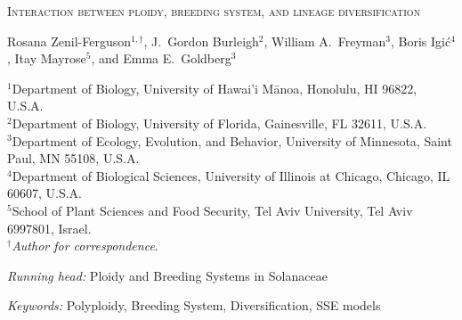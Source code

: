 \documentclass[11pt]{article}
\begin{document}


%
%
%
\begin{center}
    \textsc{Interaction between ploidy, breeding system, and lineage diversification}

\vfill

\noindent 
Rosana Zenil-Ferguson$^{1,\dagger}$,
%
J.~Gordon Burleigh$^{2}$,
%
William A.~Freyman$^{3}$,
%
Boris Igi\'c$^{4}$,
%
Itay Mayrose$^{5}$,
%
and Emma E.~Goldberg$^{3}$
%
\end{center}
%
\noindent$^{1}$Department of Biology, University of Hawai'i M\={a}noa, Honolulu, HI 96822, U.S.A.\\
%
\noindent$^{2}$Department of Biology, University of Florida, Gainesville, FL 32611, U.S.A.\\
%
\noindent$^{3}$Department of Ecology, Evolution, and Behavior, University of Minnesota, Saint Paul, MN 55108, U.S.A.\\
%
\noindent$^{4}$Department of Biological Sciences, University of Illinois at Chicago, Chicago, IL 60607, U.S.A. \\
%
\noindent$^{5}$School of Plant Sciences and Food Security, Tel Aviv University, Tel Aviv 6997801, Israel.\\
%
\noindent$^\dagger$\textit{Author for correspondence}.\\

\vfill

\noindent\textit{Running head:} 
Ploidy and Breeding Systems in Solanaceae

\noindent \textit{Keywords:} 
Polyploidy,
Breeding System,
Diversification, SSE models

\vfill

\linenumbers


\clearpage


\end{document}
